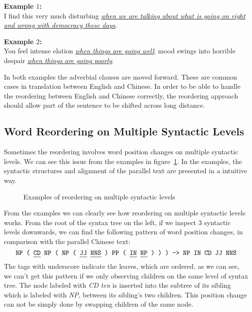\textbf{Example $1$:}\\
I find this very much disturbing \emph{\ul{when we are talking about what is going on right and wrong with democracy these days}}.\smallskip\\

\textbf{Example $2$:}\\
You feel intense elation \emph{\ul{when things are going well}}; mood swings into horrible despair \emph{\ul{when things are going poorly}}.\smallskip\\

In both examples the adverbial clauses are moved forward. These are common cases in translation between English and Chinese. In order to be able to handle the reordering between English and Chinese correctly, the reordering approach should allow part of the sentence to be shifted across long distance.

\subsection{Word Reordering on Multiple Syntactic Levels}

Sometimes the reordering involves word position changes on multiple syntactic levels. We can see this issue from the examples in figure~\ref{unstructured}. In the examples, the syntactic structures and alignment of the parallel text are presented in a intuitive way.

\begin{figure}[H]
\centering
\subfigure {

}
\subfigure {

}
\caption{Examples of reordering on multiple syntactic levels}
\label{unstructured}
\end{figure}

From the examples we can clearly see how reordering on multiple syntactic levels works. From the root of the syntax tree on the left, if we inspect $3$ syntactic levels downwards, we can find the following pattern of word position changes, in comparison with the parallel Chinese text:
$$\texttt{NP ( \ul{CD} NP ( NP ( \ul{JJ} \ul{NNS} ) PP ( \ul{IN} \ul{NP} ) ) ) -> NP IN CD JJ NNS}$$
The tags with underscore indicate the leaves, which are ordered. as we can see, we can't get this pattern if we only observing children on the same level of syntax tree. The node labeled with \emph{CD ten} is inserted into the subtree of its sibling which is labeled with \emph{NP}, between its sibling's two children. This position change can not be simply done by swapping children of the same node.

